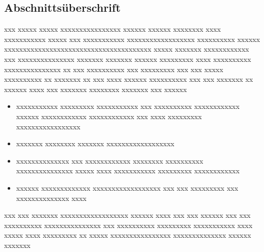 \begin{introduction}
\section[head={Evtl. Kurztitel für Kolumnentitel}]{Abschnittsüberschrift}\label{sec:xxxx}
xxx xxxxx xxxxx xxxxxxxxxxxxxxxx xxxxxx xxxxxx xxxxxxxx xxxx xxxxxxxxxxx xxxxx xxx xxxxxxxxxxx xxxxxxxxxxxxxxxxxx xxxxxxxxxx xxxxxx xxxxxxxxxxxxxxxxxxxxxxxxxxxxxxxxxxxxxxx xxxxx xxxxxxx xxxxxxxxxxxx xxx xxxxxxxxxxxxxxx xxxxxxx xxxxxxx xxxxxx xxxxxxxxx xxxx xxxxxxxxxx xxxxxxxxxxxxxxx xx xxx xxxxxxxxxx xxx xxxxxxxxx xxx xxx xxxxx xxxxxxxxxx xx xxxxxxx xx xxx xxxx xxxxxx xxxxxxxxxx xxx xxx xxxxxxx xx xxxxxx xxxx xxx xxxxxxx xxxxxxxx xxxxxxx xxx xxxxxx
\begin{itemize}
	\item xxxxxxxxxxx xxxxxxxxx xxxxxxxxxxx xxx xxxxxxxxxx xxxxxxxxxxxx xxxxxx xxxxxxxxxxxx xxxxxxxxxxxx xxx xxxx xxxxxxxxx xxxxxxxxxxxxxxxxx
	\item xxxxxxx xxxxxxxx xxxxxxx xxxxxxxxxxxxxxxxxx
	\item xxxxxxxxxxxxxx xxx xxxxxxxxxxxx xxxxxxxx xxxxxxxxxx xxxxxxxxxxxxxxx xxxxx xxxx xxxxxxxxxxx xxxxxxxxx xxxxxxxxxxxx
	\item xxxxxx xxxxxxxxxxxxx xxxxxxxxxxxxxxxxxx xxx xxx xxxxxxxxx xxx xxxxxxxxxxxxxx xxxx
\end{itemize}

xxx xxx xxxxxxx xxxxxxxxxxxxxxxxxx xxxxxx xxxx xxx xxx xxxxxx xxx xxx xxxxxxxxxx xxxxxxxxxxxxxxx xxx xxxxxxxxxx xxxxxxxxx xxxxxxxxxxx xxxx xxxxx xxxx xxxxxxxxx xx xxxxx xxxxxxxxxxxxxxxx xxxxxxxxxxxxxx xxxxxx xxxxxxx
\end{introduction}